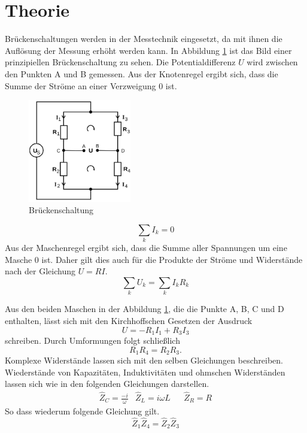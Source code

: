 \section{Theorie}
\label{sec:Theorie}
Brückenschaltungen werden in der Messtechnik eingesetzt, da mit ihnen die Auflösung
der Messung erhöht werden kann.
In Abbildung \ref{fig:Brueckenschaltung} ist das Bild einer prinzipiellen Brückenschaltung zu sehen.
Die Potentialdifferenz $U$ wird zwischen den Punkten A und B gemessen. Aus der
Knotenregel ergibt sich, dass die Summe der Ströme an einer Verzweigung $0$ ist.


\begin{figure}
  \centering
  \includegraphics[width=0.4\textwidth]{Bilder/Brueckenschaltung.png}
  \caption{Brückenschaltung}
  \label{fig:Brueckenschaltung}
\end{figure}
\begin{equation}
  \sum \limits_{k} I_k= 0
  \label{eq:knotenregel}
\end{equation}
Aus der Maschenregel ergibt sich, dass die Summe aller Spannungen um eine Masche
$0$ ist. Daher gilt dies auch für die Produkte der Ströme und Widerstände nach
der Gleichung $U=RI$.
\begin{equation}
  \sum \limits_{k} U_k=  \sum \limits_{k} I_k R_k
  \label{eq:Maschenregel}
\end{equation}

Aus den beiden Maschen in der Abbildung \ref{fig:Brueckenschaltung}, die die Punkte
A, B, C und D enthalten, lässt sich mit den Kirchhoffschen Gesetzen
der Ausdruck
\begin{equation}
  U=-R_1 I_1 + R_3 I_3
\end{equation}
schreiben. Durch Umformungen folgt schließlich
\begin{equation}
  R_1 R_4 =R_2 R_3   .
  \label{eq:Widerstand}
\end{equation}
Komplexe Widerstände lassen sich mit den selben Gleichungen beschreiben.
Wiederstände von Kapazitäten, Induktivitäten und ohmschen Widerständen lassen sich
wie in den folgenden Gleichungen darstellen.
\begin{align}
&\hat{Z}_C = \frac{-i}{\omega}  &  \hat{Z}_L=i\omega L & & \hat{Z}_R = R &
\end{align}
So dass wiederum folgende Gleichung gilt.
\begin{equation}
\hat{Z}_1\hat{Z}_4=\hat{Z}_2\hat{Z}_3
\end{equation}

